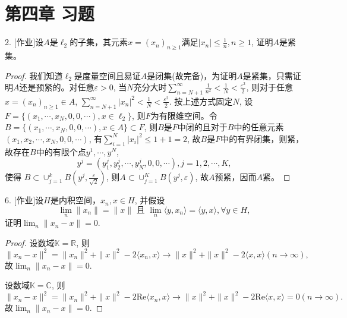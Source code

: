 \documentclass[a4paper,8pt]{ctexart}\textwidth 140mm \textheight 216mm
\newcommand{\e}{\varepsilon}
\newcommand{\8}{\infty}
\newcommand{\la}{\langle}
\newcommand{\ra}{\rangle}
\begin{document}
\section{第四章 习题}
2. [作业]设$A$是$\ell_2$的子集，其元素$x=(x_n)_{n\geq 1}$满足$|x_n|\leq\frac{1}{n},n\geq 1$, 证明$A$是紧集。
\begin{proof}
	我们知道$\ell_2$是度量空间且易证$A$是闭集(故完备)，为证明$A$是紧集，只需证明$A$还是预紧的。对任意$\e>0$, 当$N$充分大时$\sum_{n=N+1}^\infty\frac{1}{n^2}<\frac{1}{N}<\frac{\e^2}{2}$, 则对于任意$x=(x_n)_{n\geq 1}\in A$, $\sum_{n=N+1}^\infty|x_n|^2<\frac{1}{N}<\frac{\e^2}{2}$. 按上述方式固定$N$, 设$F=\{(x_1,\cdots,x_N,0,0,\cdots),x\in \ell_2\}$, 则$F$为有限维空间。令$B=\{(x_1,\cdots,x_N,0,0,\cdots),x\in A\}\subset F$, 则$B$是$F$中闭的且对于$B$中的任意元素$(x_1,x_2,\cdots,x_N,0,0,\cdots)$, 有$\sum_{i=1}^N |x_i|^2\leq 1+1=2$, 故$B$是$F$中的有界闭集，则紧，故存在$B$中的有限个点$y^1,\cdots,y^N$, 
	\begin{equation*}
	y^j=(y_1^j,y_2^j,\cdots,y_N^j,0,0,\cdots),j=1,2,\cdots,K,
	\end{equation*}
	使得
	$B\subset\cup_{j=1}^k B(y^j,\frac{\e}{\sqrt{2}})$,
	则$A\subset\cup_{j=1}^K B(y^j,\e)$, 故$A$预紧，因而$A$紧。
\end{proof}



6. [作业]设$H$是内积空间，$x_n,x\in H$, 并假设
\begin{equation*}
	\lim_{n}\|x_n\|=\|x\|\mbox{ 且 }\lim_{n}\langle y,x_n\rangle=\la y,x\ra,\forall y\in H,
\end{equation*}
证明$\lim_n\|x_n-x\|=0$.
\begin{proof}
	设数域$\mathbb{K}=\mathbb{R}$, 则
	$$\|x_n-x\|^2=\|x_n\|^2+\|x\|^2-2\la x_n,x\ra\to \|x\|^2+\|x\|^2-2\la x,x\ra(n\to\infty),$$
	故$\lim_n\|x_n-x\|=0$.
	
	设数域$\mathbb{K}=\mathbb{C}$, 则$$\|x_n-x\|^2=\|x_n\|^2+\|x\|^2-2\mathrm{Re}\la x_n,x\ra\to \|x\|^2+\|x\|^2-2\mathrm{Re}\la x,x\ra=0(n\to\infty).$$
	故$\lim_n\|x_n-x\|=0$.
\end{proof}

\end{document}
